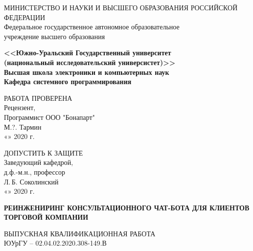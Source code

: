 \begin{titlepage}
    \begin{center}
        МИНИСТЕРСТВО И НАУКИ И ВЫСШЕГО ОБРАЗОВАНИЯ РОССИЙСКОЙ ФЕДЕРАЦИИ\\
        Федеральное государственное автономное образовательное\\
        учреждение высшего образования

        \textbf{
        <<Южно-Уральский Государственный университет\\
        (национальный исследовательский универсистет)>>\\
        Высшая школа электроники и компьютерных наук\\
        Кафедра системного программирования
        }
        \bigskip
        
        \noindent
        \newline
        \begin{minipage}{0.5\textwidth}
            РАБОТА ПРОВЕРЕНА\\
            Рецензент,\\
            Программист ООО "Бонапарт"\\
            \underline{\hspace{2cm}} М.?. Тармин\\
            «\underline{\hspace{0.7cm}}» \underline{\hspace{2cm}} 2020 г.
        \end{minipage}
        \vspace{\fill}
        \begin{minipage}{0.4\textwidth}
            ДОПУСТИТЬ К ЗАЩИТЕ\\
            Заведующий кафедрой,\\
            д.ф.-м.н., профессор\\
            \underline{\hspace{2cm}} Л.\,Б. Соколинский\\
            «\underline{\hspace{0.7cm}}» \underline{\hspace{2cm}} 2020 г.
        \end{minipage}

        \vfill
        \large\textbf{
            РЕИНЖЕНИРИНГ КОНСУЛЬТАЦИОННОГО ЧАТ-БОТА ДЛЯ КЛИЕНТОВ ТОРГОВОЙ КОМПАНИИ
        }        
        \bigskip
        
        ВЫПУСКНАЯ КВАЛИФИКАЦИОННАЯ РАБОТА\\
        ЮУрГУ – 02.04.02.2020.308-149.В
    \end{center}
    \vfill


\end{titlepage}
